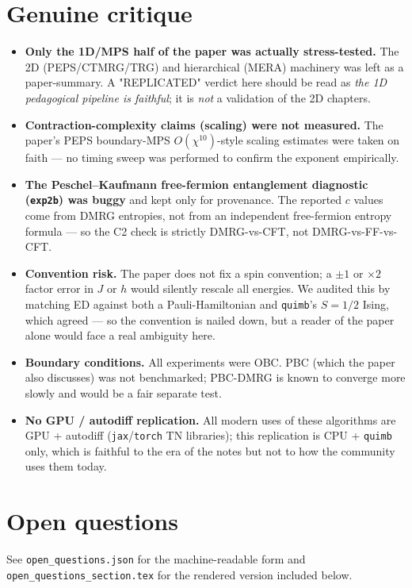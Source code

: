 \documentclass[11pt]{article}
\begin{document}
\section{Genuine critique}
\begin{itemize}
  \item \textbf{Only the 1D/MPS half of the paper was actually stress-tested.} The 2D (PEPS/CTMRG/TRG) and hierarchical (MERA) machinery was
        left as a paper-summary. A "REPLICATED" verdict here should be read as \emph{the 1D pedagogical pipeline is faithful};
        it is \emph{not} a validation of the 2D chapters.
  \item \textbf{Contraction-complexity claims (scaling) were not measured.} The paper's PEPS boundary-MPS $O(\chi^{10})$-style scaling estimates
        were taken on faith --- no timing sweep was performed to confirm the exponent empirically.
  \item \textbf{The Peschel--Kaufmann free-fermion entanglement diagnostic (\texttt{exp2b}) was buggy} and kept only for provenance.
        The reported $c$ values come from DMRG entropies, not from an independent free-fermion entropy formula --- so the C2 check is
        strictly DMRG-vs-CFT, not DMRG-vs-FF-vs-CFT.
  \item \textbf{Convention risk.} The paper does not fix a spin convention; a $\pm 1$ or $\times 2$ factor error in $J$ or $h$ would silently
        rescale all energies. We audited this by matching ED against both a Pauli-Hamiltonian and \texttt{quimb}'s $S{=}1/2$ Ising, which agreed --- so
        the convention is nailed down, but a reader of the paper alone would face a real ambiguity here.
  \item \textbf{Boundary conditions.} All experiments were OBC. PBC (which the paper also discusses) was not benchmarked; PBC-DMRG is known to
        converge more slowly and would be a fair separate test.
  \item \textbf{No GPU / autodiff replication.} All modern uses of these algorithms are GPU + autodiff (\texttt{jax}/\texttt{torch} TN libraries); this
        replication is CPU + \texttt{quimb} only, which is faithful to the era of the notes but not to how the community uses them today.
\end{itemize}

\section{Open questions}
\label{sec:openq}
See \texttt{open\_questions.json} for the machine-readable form and
\texttt{open\_questions\_section.tex} for the rendered version included below.

\end{document}
